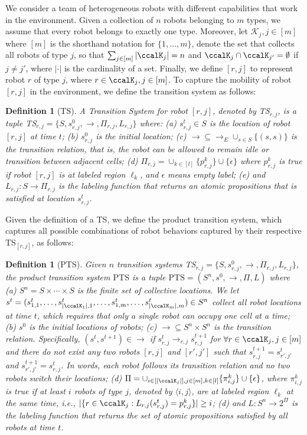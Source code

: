 \documentclass[journal]{IEEEtran}
\newtheorem{defn}[thm]{Definition}
\newcommand{\ag}[2]{\langle#1,#2\rangle}
\renewcommand{\ap}[3]{\mathcal{\pi}_{{#1},{#2}}^{#3}}
\begin{document}
We consider a team of heterogeneous robots with different capabilities that work in the environment. Given a collection of $n$ robots belonging to $m$ types, we assume that every robot belongs to exactly one type. Moreover, let $\mathcal{K}_j, j\in[m]$ where $[m]$ is the shorthand notation for  $\{1,\ldots,m\}$, denote the set that  collects all robots of type $j$, so that $\sum_{j\in [m]} |\ccalK_j| = n$ and $\ccalK_{j} \cap \ccalK_{j'} = \emptyset$ if $j \not= j'$, where $|\cdot|$ is the cardinality of a set. Finally, we define $[r,j]$ to represent robot $r$ of type $j$, where $r\in \ccalK_j, j\in [m]$. To capture the mobility of robot $[r,j]$ in the environment, we define the { transition system} as follows:
\begin{defn}[TS]\label{def:ts}
  A { Transition System} for robot $[r,j]$, denoted by TS$_{r,j}$, is a tuple TS$_{r,j} = \{S, s_{r,j}^0, \to, \Pi_{r,j}, L_{r,j}\}$ where: (a) $s_{r,j}^t \in S$ is the location of robot $[r,j]$ at time $t$; (b) $s_{r,j}^0$ is the initial location; (c) $\to \subseteq \to_{E} \cup_{s\in S} \{(s,s)\} $ is the transition relation, that is, the robot can be allowed to remain idle or transition between adjacent cells; (d) $\Pi_{r,j} = \cup_{k\in [l]}\{p_{r,j}^k\} \cup \{\epsilon\}$ where $p_{r,j}^{k}$ is true if robot $[r,j]$ is at labeled region $\ell_k$, and $\epsilon$ means empty label; (e) and $L_{r,j}: S \to \Pi_{r,j} $ is the labeling function that returns an atomic propositions that is satisfied at location $s_{r,j}^t$.
\end{defn}

Given the definition of a TS, we define the {product transition system}, which captures all possible combinations of robot behaviors captured by their respective TS$_{[r,j]}$, as follows:
\begin{defn}[PTS]\label{def:pts}
  Given $n$ transition systems TS$_{r,j} = \{S, s_{r,j}^0, \to, \Pi_{r,j}, L_{r,j}\}$, the product transition system $\text{PTS}$ is a tuple $\text{PTS} = (S^n, s^0, \to, \Pi, L)$ where (a) $S^n = S\times \cdots \times S$ is the finite set of collective locations. We let $s^t = (s_{1,1}^t, \ldots, s_{|\ccalK_1|,1}^t, \ldots, s_{1,m}^t, \ldots, s_{|\ccalK_m|, m}^t) \in S^n$ collect all robot locations at time $t$, which requires that only a single robot can occupy one cell at a time; (b) $s^0$ is the initial locations of robots; (c) $\to \subseteq S^n \times S^n$ is the transition relation. Specifically, $(s^t, s^{t+1}) \in \to$ if $s^t_{r,j}\rightarrow_{r,j} s^{t+1}_{r,j}$ for $\forall r\in \ccalK_j, j \in [m]$ and there do not exist any two robots $[r,j]$ and $[r',j']$ such that $s^{t+1}_{r,j} = s^{t}_{r',j'}$ and $s^{t+1}_{r',j'} = s^{t}_{r,j}$. In words, each robot follows its transition relation and no two robots switch their locations; (d) $\Pi = \cup_{i\in[|\ccalK_j|], j\in [m], k\in [l]}\{\pi_{i,j}^k\} \cup \{\epsilon\}$, where $\ap{i}{j}{k}$ is true if at least $i$ robots of type $j$, denoted by $\ag{i}{j}$, are at labeled region $\ell_k$ at the same time, i.e., $|\{r\in \ccalK_j: L_{r,j}(s_{r,j}^t) = p_{r,j}^k \}| \geq i$; (d) and $L: S^n \to 2^{\Pi}$ is the labeling function that returns the set of atomic propositions satisfied by all robots at time $t$.
\end{defn}
\end{document}
